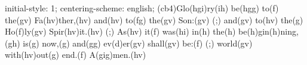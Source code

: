 initial-style: 1;
centering-scheme: english;
(cb4)Glo(hgi)ry(ih) be(hgg) to(f) the(gv) Fa(hv)ther,(hv) and(hv) to(fg) the(gv) Son:(gv) (;) and(gv) to(hv) the(g) Ho(f)ly(gv) Spir(hv)it.(hv) (;) As(hv) it(f) was(hi) in(h) the(h) be(h)gin(h)ning,(gh) is(g) now,(g) and(gg) ev(d)er(gv) shall(gv) be:(f) (;) world(gv) with(hv)out(g) end.(f) A(gig)men.(hv)
